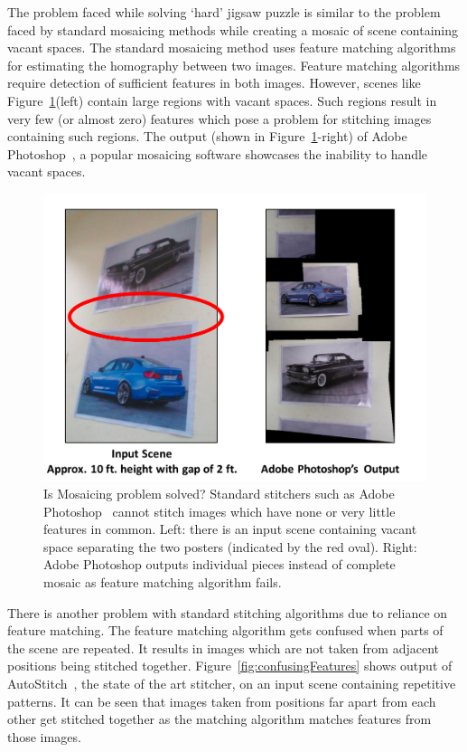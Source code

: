 \begin{itemize}
  The problem faced while solving `hard' jigsaw puzzle is similar to the problem
  faced by standard mosaicing methods while creating a mosaic of scene
  containing vacant spaces. The standard mosaicing method uses feature matching
  algorithms for estimating the homography between two images. Feature matching
  algorithms require detection of sufficient features in both images. However,
  scenes like Figure~\ref{fig:vacantSpacesExample}(left) contain large regions
  with vacant spaces. Such regions result in very few (or almost zero) features
  which pose a problem for stitching images containing such regions. The output
  (shown in Figure~\ref{fig:vacantSpacesExample}-right) of Adobe
  Photoshop~\cite{photoshop}, a popular mosaicing software showcases the
  inability to handle vacant spaces.
  
 \begin{figure}[h!]
\centering
\includegraphics[width=0.98\linewidth]{figures/vacantSpacesExample}
 \caption[Problem of mosaicing scene with vacant spaces using Adobe
 Photoshop]{Is Mosaicing problem solved? Standard stitchers such as Adobe
 Photoshop~\cite{photoshop} cannot stitch images which have none or very little
 features in common. Left: there is an input scene containing vacant space
 separating the two posters (indicated by the red oval). Right: Adobe Photoshop
 outputs individual pieces instead of complete mosaic as feature matching
 algorithm fails.}
\label{fig:vacantSpacesExample}
\end{figure}
 
  There is another problem with standard stitching algorithms due to 
  reliance on feature matching. The feature matching algorithm gets confused
  when parts of the scene are repeated. It results in images which are not
  taken from adjacent positions being stitched together.
  Figure~\ref{fig:confusingFeatures} shows output of
  AutoStitch~\cite{autostitch}, the state of the art stitcher, on an input
  scene containing repetitive patterns. It can be seen that images taken from
  positions far apart from each other get stitched together as the matching
  algorithm matches features from those images.


\end{itemize}
